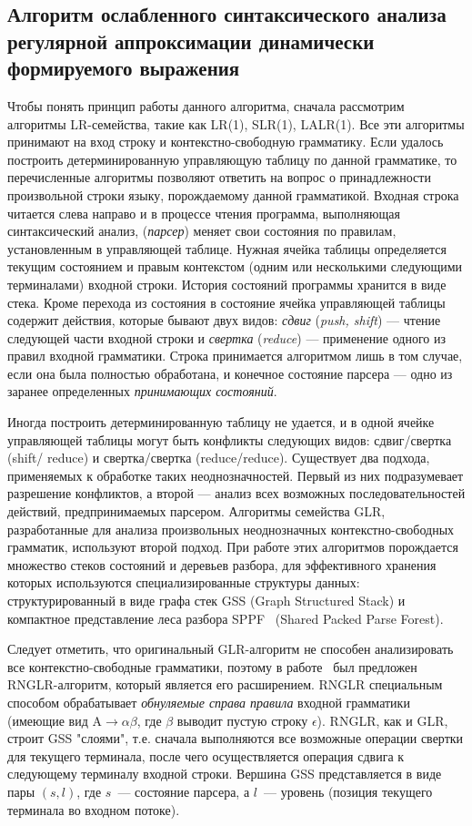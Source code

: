 \subsection{Алгоритм ослабленного синтаксического анализа регулярной аппроксимации динамически формируемого выражения}
Чтобы понять принцип работы данного алгоритма, сначала рассмотрим алгоритмы LR-семейства, такие как LR(1), SLR(1), LALR(1). Все эти алгоритмы принимают на вход строку и контекстно-свободную грамматику. Если удалось построить детерминированную управляющую таблицу по данной грамматике, то перечисленные алгоритмы позволяют ответить на вопрос о принадлежности произвольной строки языку, порождаемому данной грамматикой. Входная строка читается слева направо и в процессе чтения программа, выполняющая синтаксический анализ, (\emph{парсер}) меняет свои состояния по правилам, установленным в управляющей таблице. Нужная ячейка таблицы определяется текущим состоянием и правым контекстом (одним или несколькими следующими терминалами) входной строки. История состояний программы хранится в виде стека. Кроме перехода из состояния в состояние ячейка управляющей таблицы содержит действия, которые бывают двух видов: \emph{сдвиг} (\emph{push, shift}) --- чтение следующей части входной строки и \emph{свертка} (\emph{reduce}) --- применение одного из правил входной грамматики. Строка принимается алгоритмом лишь в том случае, если она была полностью обработана, и конечное состояние парсера --- одно из заранее определенных \emph{принимающих состояний}.

Иногда построить детерминированную таблицу не удается, и в одной ячейке управляющей таблицы могут быть конфликты следующих видов: сдвиг/свертка (shift/ reduce) и свертка/свертка (reduce/reduce). Существует два подхода, применяемых к обработке таких неоднозначностей. Первый из них подразумевает разрешение конфликтов, а второй --- анализ всех возможных последовательностей действий, предпринимаемых парсером. Алгоритмы семейства GLR, разработанные для анализа произвольных неоднозначных контекстно-свободных грамматик, используют второй подход. При работе этих алгоритмов порождается множество стеков состояний и деревьев разбора, для эффективного хранения которых используются специализированные структуры данных: структурированный в виде графа стек GSS (Graph Structured Stack) и компактное представление леса разбора SPPF~\cite{SPPF} (Shared Packed Parse Forest).

Следует отметить, что оригинальный GLR-алгоритм не способен анализировать все контекстно-свободные грамматики, поэтому в работе~\cite{RNGLR} был предложен RNGLR-алгоритм, который является его расширением. RNGLR специальным способом обрабатывает \emph{обнуляемые справа правила} входной грамматики (имеющие вид $\mathrm{A} \rightarrow \alpha \beta$, где $\beta$ выводит пустую строку $\epsilon$). RNGLR, как и GLR, строит GSS "слоями", т.е. сначала выполняются все возможные операции свертки для текущего терминала, после чего осуществляется операция сдвига к следующему терминалу входной строки. Вершина GSS представляется в виде пары $(s,l)$, где $s$~--- состояние парсера, а $l$~--- уровень (позиция текущего терминала во входном потоке).

